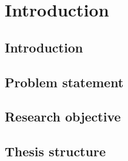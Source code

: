 \chapter*{Introduction}

\section*{Introduction}
\section*{Problem statement}
\section*{Research objective}
\section*{Thesis structure}

